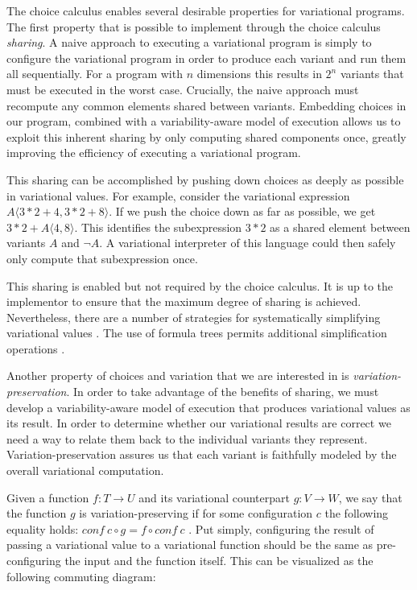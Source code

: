 \documentclass[12pt,oneside]{book}
\newcommand{\tagtree}[3]{#1 \langle #2, #3 \rangle}
\begin{document}
The choice calculus enables several desirable properties for variational programs.
The first property that is possible to implement through the choice calculus \emph{sharing}. A naive approach to executing a variational program is simply to
configure the variational program in order to produce each variant and run them all sequentially.
For a program with $n$ dimensions this results in $2^n$ variants that must be executed in the worst case. Crucially,
the naive approach must recompute any common elements shared between variants. Embedding
choices in our program, combined with a variability-aware model of execution allows us to exploit this
inherent sharing by only computing shared components once, greatly improving the efficiency of
executing a variational program.

This sharing can be accomplished by pushing down choices as deeply as possible in variational
values. For example, consider the variational expression $\tagtree{A}{3*2+4}{3*2+8}$. If we push
the choice down as far as possible, we get $3*2+\tagtree{A}{4}{8}$. This identifies the subexpression
$3*2$ as a shared element between variants $A$ and $\neg A$. A variational interpreter of this
language could then safely only compute that subexpression once.

This sharing is enabled but not required by the choice calculus. It is up to the implementor to
ensure that the maximum degree of sharing is achieved. Nevertheless, there are a number of
strategies for systematically simplifying variational values \cite{Walk13thesis}. The use of formula
trees permits additional simplification operations \cite{HW16fosd,WO14gpce}.

Another property of choices and variation that we are interested in is \emph{variation-preservation}. In order
to take advantage of the benefits of sharing, we must develop a variability-aware model of execution
that produces variational values as its result. In order to determine whether our variational results
are correct we need a way to relate them back to the individual variants they represent.
Variation-preservation assures us that each variant is faithfully modeled by the overall variational computation.

Given a function $f : T \rightarrow U$ and its variational counterpart $g : V \rightarrow W$, we say that
the function $g$ is variation-preserving if for some configuration $c$ the following equality holds:
$\mathit{conf}\ c \circ g = f \circ \mathit{conf}\ c$ \cite{HW16fosd}. Put simply, configuring the result
of passing a variational value to a variational function should be the same as pre-configuring the input
and the function itself. This can be visualized as the following commuting diagram:
\end{document}
